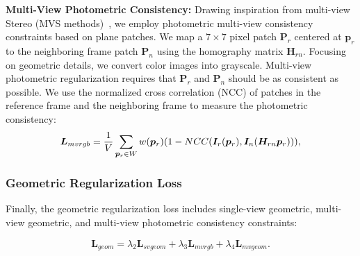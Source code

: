 \documentclass[lettersize,journal]{IEEEtran}
\begin{document}
\textbf{Multi-View Photometric Consistency:}
Drawing inspiration from multi-view Stereo (MVS methods)~\cite{schonberger2016structure,campbell2008using,fu2022geo}, we employ photometric multi-view consistency constraints based on plane patches. We map a $7\times 7$ pixel patch $ \bm{P}_r $ centered at $ \bm{p}_r $ to the neighboring frame patch $ \bm{P}_n $ using the homography matrix $ \bm{H}_{rn} $. Focusing on geometric details, we convert color images into grayscale. Multi-view photometric regularization requires that $ \bm{P}_r $ and $ \bm{P}_n $ should be as consistent as possible. We use the normalized cross correlation (NCC)\cite{yoo2009fast} of patches in the reference frame and the neighboring frame to measure the photometric consistency:
\begin{equation}\color{r}
    \bm{L}_{mvrgb}=\frac{1}{V}\sum_{\bm{p}_r\in W}w(\bm{p}_r)(1-NCC(\bm{I}_r(\bm{p}_r), \bm{I}_n(\bm{H}_{rn}\bm{p}_r))),
\end{equation}

\subsubsection{Geometric Regularization Loss}

Finally, the geometric regularization loss includes single-view geometric, multi-view geometric, and multi-view photometric consistency constraints:

\begin{equation}
    \bm{L}_{geom}=\lambda_2\bm{L}_{svgeom}+\lambda_3\bm{L}_{mvrgb}+\lambda_4\bm{L}_{mvgeom}.
\end{equation}


\end{document}

